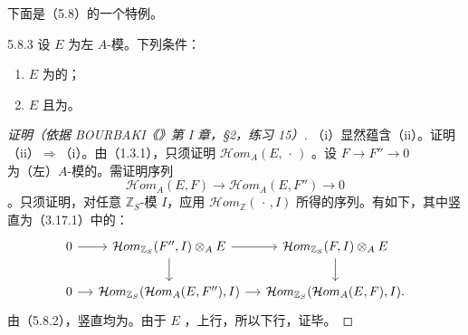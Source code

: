 下面是（5.8）的一个特例。
\begin{SGAresult}{}{5.8.3}
设 $E$ 为左 $A$-模。下列条件：
\begin{enumerate}
\item[(i)] $E$ 为的；
\item[(ii)] $E$ 且为。
\end{enumerate}
\end{SGAresult}
\begin{proof}[证明（依据 BOURBAKI《》第 I 章，\S 2，练习 15）]
（i）显然蕴含（ii）。证明（ii）$\Rightarrow$（i）。由（1.3.1），只须证明 $\mathcal Hom_A(E,\,\cdot\,)$ 。设 $F\to F''\to0$ 为（左）$A$-模的。需证明序列
\[\mathcal Hom_A(E,F)\longrightarrow\mathcal Hom_A(E,F'')\longrightarrow0\]
。只须证明，对任意 $\mathbb Z_S$-模 $I$，应用 $\mathcal Hom_{\mathbb Z}(\,\cdot\,,I)$ 所得的序列。有如下，其中竖直为（3.17.1）中的：
\[\begin{tikzcd}[column sep=small]
0\arrow[r]&\mathcal Hom_{\mathbb Z_S}(F'',I)\otimes_A E\arrow[r]\arrow[d]&\mathcal Hom_{\mathbb Z_S}(F,I)\otimes_A E\arrow[d]\\
0\arrow[r]&\mathcal Hom_{\mathbb Z_S}(\mathcal Hom_A(E,F''),I)\arrow[r]&\mathcal Hom_{\mathbb Z_S}(\mathcal Hom_A(E,F),I).
\end{tikzcd}\]
由（5.8.2），竖直均为。由于 $E$ ，上行，所以下行，证毕。
\end{proof}

